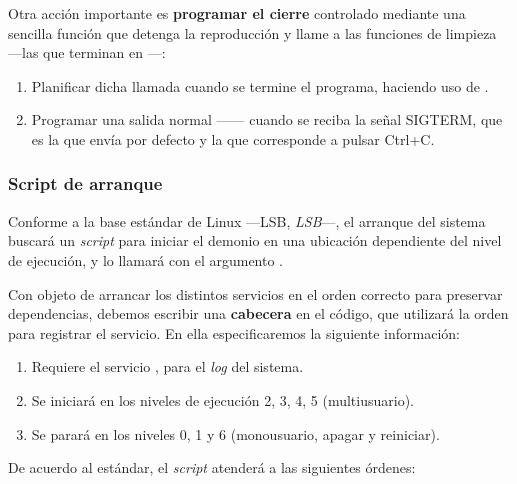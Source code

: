 Otra acción importante es \textbf{programar el cierre} controlado mediante una sencilla función que detenga la reproducción y llame a las funciones de limpieza ---las que terminan en ---:

\begin{enumerate}
	\item Planificar dicha llamada cuando se termine el programa, haciendo uso de .
	\item Programar una salida normal ------ cuando se reciba la señal SIGTERM, que es la que envía por defecto  y la que corresponde a pulsar Ctrl+C.
\end{enumerate}

\subsubsection{Script de arranque}

Conforme a la base estándar de Linux ---\acrshort{LSB}, \textit{\acrlong{LSB}}---, el arranque del sistema buscará un \textit{script} para iniciar el demonio en una ubicación dependiente del nivel de ejecución, y lo llamará con el argumento . \cite{debian_lsbinit}

Con objeto de arrancar los distintos servicios en el orden correcto para preservar dependencias, debemos escribir una \textbf{cabecera} en el código, que utilizará la orden  para registrar el servicio. En ella especificaremos la siguiente información:

\begin{enumerate}
	\item Requiere el servicio , para el \textit{log} del sistema.
	\item Se iniciará en los niveles de ejecución 2, 3, 4, 5 (multiusuario). \cite{wiki_runlevel}
	\item Se parará en los niveles 0, 1 y 6 (monousuario, apagar y reiniciar).
\end{enumerate}

De acuerdo al estándar, el \textit{script} atenderá a las siguientes órdenes:

